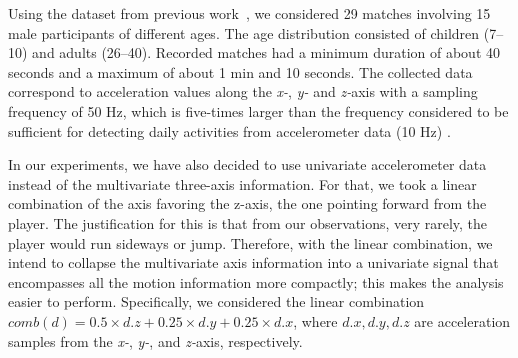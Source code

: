 {Using the dataset from previous work~\cite{oliveira_activity_2017,oliveira_modeling_2017}, we considered 29 matches involving 15 male participants of different ages. The age distribution consisted of children (7--10) and adults (26--40). Recorded matches had a minimum duration of about 40 seconds and a maximum of about 1 min and 10 seconds. The collected data correspond to acceleration values along the \textit{x-}, \textit{y-} and \textit{z-}axis with a sampling frequency of 50 Hz, which is five-times larger than the frequency considered to be sufficient for detecting daily activities from accelerometer data (10 Hz) \cite{atallah_sensor_2010, ravi_activity_2005, kikhia_analyzing_2014}.

In our experiments, we have also decided to use univariate accelerometer data instead of the multivariate three-axis information. For that, we took a linear combination of the axis favoring the z-axis, the one pointing forward from the player. The justification for this is that from our observations, very rarely, the player would run sideways or jump. Therefore, with the linear combination, we intend to collapse the multivariate axis information into a univariate signal that encompasses all the motion information more compactly; this makes the analysis easier to perform. Specifically, we considered the linear combination $comb(d) = 0.5 \times d.z + 0.25 \times d.y + 0.25 \times d.x$, where $d.x, d.y, d.z$ are acceleration samples from the \textit{x-}, \textit{y-}, and \textit{z-}axis, respectively. 

}
